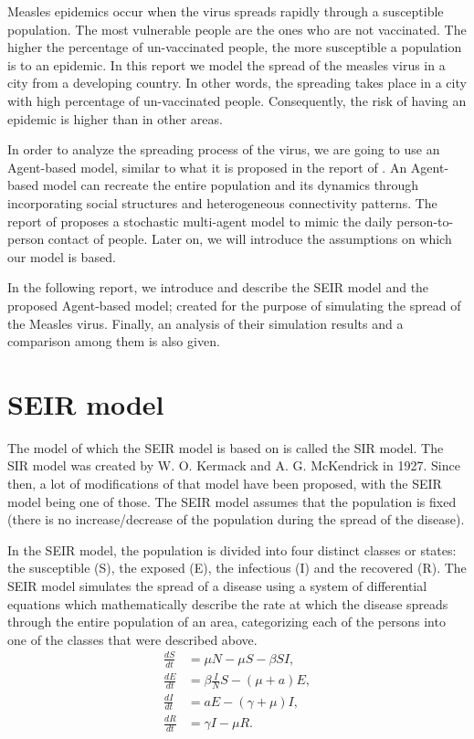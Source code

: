 \documentclass[a4paper]{article}
\begin{document}
Measles epidemics occur when the virus spreads rapidly through a susceptible population. The most vulnerable people are the ones who are not vaccinated. The higher the percentage of un-vaccinated people, the more susceptible a population is to an epidemic. In this report we model the spread of the measles virus in a city from a developing country. In other words, the spreading takes place in a city with high percentage of un-vaccinated people. Consequently, the risk of having an epidemic is higher than in other areas. 

In order to analyze the spreading process of the virus, we are going to use an Agent-based model, similar to what it is proposed in the report of \cite{Egypt}. An Agent-based model can recreate the entire population and its dynamics through incorporating social structures and heterogeneous connectivity patterns. The report of \cite{Egypt} proposes a stochastic multi-agent model to mimic the daily person-to-person contact of people. Later on, we will introduce the assumptions on which our model is based. 

In the following report, we introduce and describe the SEIR model and the proposed Agent-based model; created for the purpose of simulating the spread of the Measles virus. Finally, an analysis of their simulation results and a comparison among them is also given.

\section{SEIR model}
The model of which the SEIR model is based on is called the SIR model. The SIR model was created by W. O. Kermack and A. G. McKendrick in 1927. Since then, a lot of modifications of that model have been proposed, with the SEIR model being one of those. The SEIR model assumes that the population is fixed (there is no increase/decrease of the population during the spread of the disease).

In the SEIR model, the population is divided into four distinct classes or states: the susceptible (S), the exposed (E), the infectious (I) and the recovered (R). The SEIR model simulates the spread of a disease using a system of differential equations which mathematically describe the rate at which the disease spreads through the entire population of an area, categorizing each of the persons into one of the classes that were described above.
 \begin{align*}
  \frac{dS}{dt} &= \mu N - \mu S - \beta S I, \\
  \frac{dE}{dt} &= \beta \frac{I}{N} S - (\mu + a) E, \\
  \frac{dI}{dt} &= a E - (\gamma+\mu) I, \\
  \frac{dR}{dt} &= \gamma I - \mu R.
 \end{align*}
\end{document}
